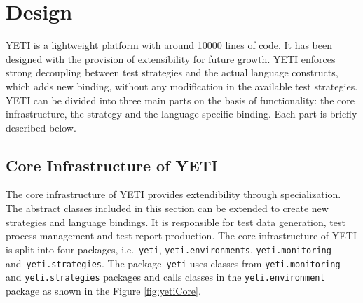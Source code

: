 \section{Design}
YETI is a lightweight platform with around 10000 lines of code. It has been designed with the provision of extensibility for future growth. YETI enforces strong decoupling between test strategies and the actual language constructs, which adds new binding, without any modification in the available test strategies. YETI can be divided into three main parts on the basis of functionality: the core infrastructure, the strategy and the language-specific binding. Each part is briefly described below. 

\subsection{Core Infrastructure of YETI}
The core infrastructure of YETI provides extendibility through specialization. The abstract classes included in this section can be extended to create new strategies and language bindings. It is responsible for test data generation, test process management and test report production. The core infrastructure of YETI is split into four packages, i.e.~\verb+yeti+, \verb+yeti.environments+, \verb+yeti.monitoring+ and~\verb+yeti.strategies+. The package~\verb+yeti+ uses
classes from \verb+yeti.monitoring+ and \verb+yeti.strategies+ packages and calls classes in the \verb+yeti.environment+ package as shown in the Figure \ref{fig:yetiCore}.

